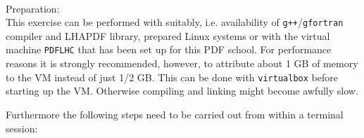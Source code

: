 \documentclass[12pt,a4paper,twoside]{article}
\begin{document}
\\

\noindent
Preparation:\\
This exercise can be performed with suitably, i.e. availability of
{\tt g++}/{\tt gfortran} compiler and LHAPDF library, prepared Linux
systems or with the virtual machine {\tt PDFLHC} that has been set up
for this PDF school. For performance reasons it is strongly
recommended, however, to attribute about 1 GB of memory to the VM
instead of just 1/2 GB\@. This can be done with {\tt virtualbox}
before starting up the VM\@. Otherwise compiling and linking might
become awfully slow.

Furthermore the following steps need to be carried out from within a
terminal session:
\end{document}
